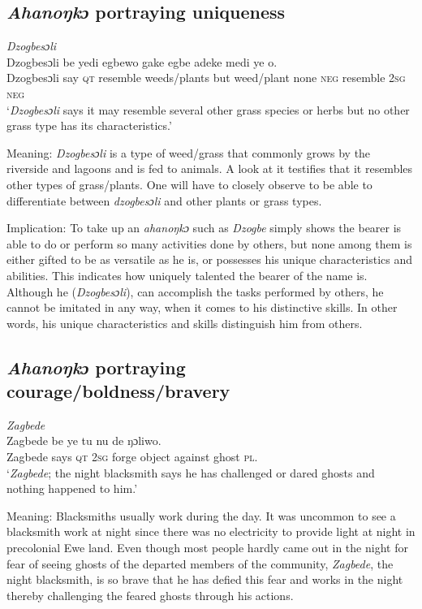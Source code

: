 \documentclass[output=paper]{langscibook}
\begin{document}
\subsection{{\textit{Ahanoŋkɔ}} portraying uniqueness}
\ea \emph{Dzogbesɔli}\\
\gll Dzogbesɔli be yedi egbewo gake egbe adeke medi ye o.\\
Dzogbesɔli {say \textsc{qt}} resemble weeds/plants but weed/plant none {\textsc{neg} resemble} \textsc{2sg} \textsc{neg}\\
\glt  ‘{\textit{Dzogbesɔli}} says it may resemble several other grass species or herbs but no other grass type has its characteristics.’
\z

\noindent Meaning: \textit{Dzogbesɔli} is a type of weed/grass that commonly grows by the riverside and lagoons and is fed to animals. A look at it testifies that it resembles other types of grass/plants. One will have to closely observe to be able to differentiate between \textit{dzogbesɔli} and other plants or grass types. 

Implication: To take up an \textit{ahanoŋkɔ} such as \textit{Dzogbe} simply shows the bearer is able to do or perform so many activities done by others, but none among them is either gifted to be as versatile as he is, or possesses his unique characteristics and abilities. This indicates how uniquely talented the bearer of the name is. Although he ({\textit{Dzogbesɔli}}), can accomplish the tasks performed by others, he cannot be imitated in any way, when it comes to his distinctive skills. In other words, his unique characteristics and skills distinguish him from others. 

\subsection{{\textit{Ahanoŋkɔ}} portraying courage/boldness/bravery}

\ea \emph{Zagbede}\\
\gll Zagbede be ye tu nu de ŋɔliwo.\\
Zagbede {says \textsc{qt}} \textsc{2sg} forge object against {ghost  \textsc{pl}}.\\
\glt  ‘{\textit{Zagbede}}; the night blacksmith says he has challenged or dared ghosts and nothing happened to him.’
\z

\noindent Meaning: Blacksmiths usually work during the day. It was uncommon to see a blacksmith work at night since there was no electricity to provide light at night in precolonial Ewe land. Even though most people hardly came out in the night for fear of seeing ghosts of the departed members of the community, {\textit{Zagbede}}, the night blacksmith, is so brave that he has defied this fear and works in the night thereby challenging the feared ghosts through his actions.
\end{document}

